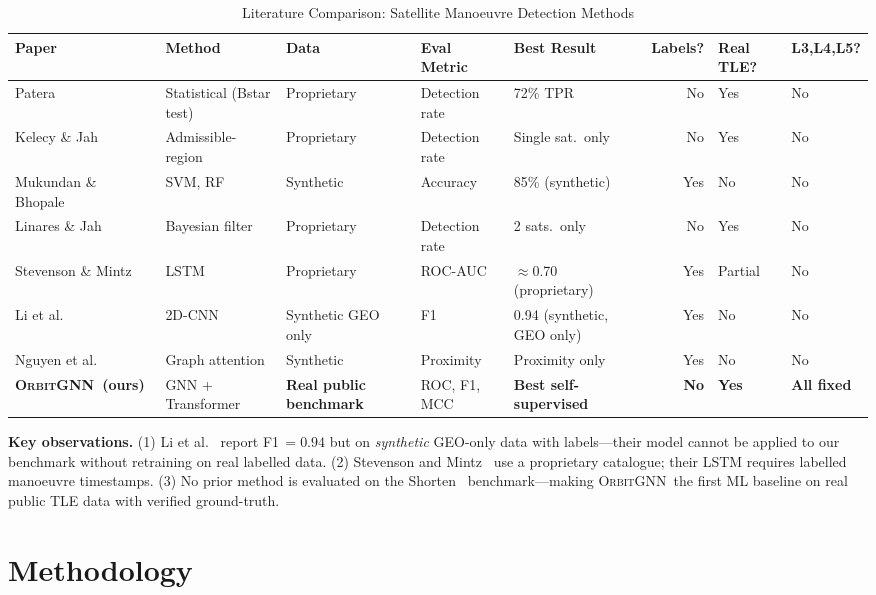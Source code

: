 \documentclass[journal]{IEEEtran}
\newcommand{\orbitgnn}{\textsc{OrbitGNN}}
\begin{document}
\begin{table}[t]
\centering
\caption{Literature Comparison: Satellite Manoeuvre Detection Methods}
\label{tab:litreview}
\setlength\tabcolsep{4pt}
\begin{tabular}{@{}lllllrll@{}}
\toprule
Paper & Method & Data & Eval Metric & Best Result & Labels? & Real TLE? & L3,L4,L5?\\
\midrule
Patera~\cite{patera2008} & Statistical (Bstar test) & Proprietary & Detection rate & 72\% TPR & No & Yes & No\\
Kelecy \& Jah~\cite{kelecy2012} & Admissible-region & Proprietary & Detection rate & Single sat.\ only & No & Yes & No\\
Mukundan \& Bhopale~\cite{mukundan2019} & SVM, RF & Synthetic & Accuracy & 85\% (synthetic) & Yes & No & No\\
Linares \& Jah~\cite{linares2014} & Bayesian filter & Proprietary & Detection rate & 2 sats.\ only & No & Yes & No\\
Stevenson \& Mintz~\cite{stevenson2022} & LSTM & Proprietary & ROC-AUC & $\approx$0.70 (proprietary) & Yes & Partial & No\\
Li et al.~\cite{li2024} & 2D-CNN & Synthetic GEO only & F1 & 0.94 (synthetic, GEO only) & Yes & No & No\\
Nguyen et al.~\cite{nguyen2022} & Graph attention & Synthetic & Proximity & Proximity only & Yes & No & No\\
\midrule
\textbf{\orbitgnn\ (ours)} & GNN + Transformer & \textbf{Real public benchmark} & ROC, F1, MCC & \textbf{Best self-supervised} & \textbf{No} & \textbf{Yes} & \textbf{All fixed}\\
\bottomrule
\end{tabular}
\end{table}

\textbf{Key observations.} (1) Li et al.~\cite{li2024} report F1\,$=0.94$
but on \emph{synthetic} GEO-only data with labels---their model cannot be
applied to our benchmark without retraining on real labelled data.
(2) Stevenson and Mintz~\cite{stevenson2022} use a proprietary catalogue;
their LSTM requires labelled manoeuvre timestamps.
(3) No prior method is evaluated on the Shorten~\cite{shorten2023}
benchmark---making \orbitgnn\ the first ML baseline on real public TLE data
with verified ground-truth.

\section{Methodology}
\end{document}
